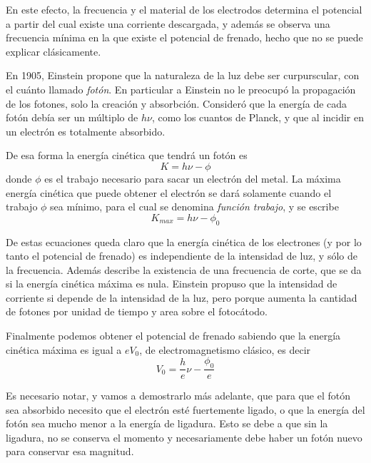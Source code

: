 En este efecto, la frecuencia y el material de los electrodos determina el potencial a partir del cual existe una corriente descargada, y además se observa una frecuencia mínima en la que existe el potencial de frenado, hecho que no se puede explicar clásicamente.

En 1905, Einstein propone que la naturaleza de la luz debe ser curpurscular, con el cuánto llamado \emph{fotón}. 
En particular a Einstein no le preocupó la propagación de los fotones, solo la creación y absorbción.
Consideró que la energía de cada fotón debía ser un múltiplo de $h\nu$, como los cuantos de Planck, y que al incidir en un electrón es totalmente absorbido.

De esa forma la energía cinética que tendrá un fotón es
\begin{equation}
    K = h \nu - \phi
\end{equation}
donde $\phi$ es el trabajo necesario para sacar un electrón del metal.
La máxima energía cinética que puede obtener el electrón se dará solamente cuando el trabajo $\phi$ sea mínimo, para el cual se denomina \emph{función trabajo}, y se escribe
\begin{equation}
  K_{max} = h\nu - \phi_0
\end{equation}

De estas ecuaciones queda claro que la energía cinética de los electrones (y por lo tanto el potencial de frenado) es independiente de la intensidad de luz, y sólo de la frecuencia.
Además describe la existencia de una frecuencia de corte, que se da si la energía cinética máxima es nula.
Einstein propuso que la intensidad de corriente si depende de la intensidad de la luz, pero porque aumenta la cantidad de fotones por unidad de tiempo y area sobre el fotocátodo.

Finalmente podemos obtener el potencial de frenado sabiendo que la energía cinética máxima es igual a $eV_0$, de electromagnetismo clásico, es decir
\begin{equation}
 V_0 = \frac{h}{e} \nu - \frac{\phi_0}{e}
 \label{eq:fotoelectrico}
\end{equation}

Es necesario notar, y vamos a demostrarlo más adelante, que para que el fotón sea absorbido necesito que el electrón esté fuertemente ligado, o que la energía del fotón sea mucho menor a la energía de ligadura.
Esto se debe a que sin la ligadura, no se conserva el momento y necesariamente debe haber un fotón nuevo para conservar esa magnitud.


